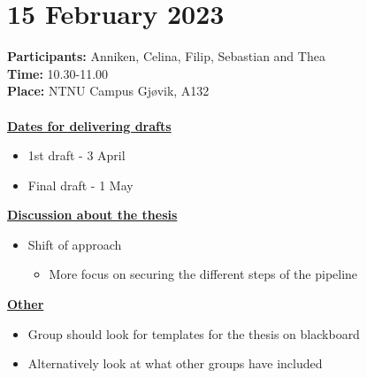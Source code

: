 \section{15 February 2023}
\textbf{Participants:} Anniken, Celina, Filip, Sebastian and Thea \\
\textbf{Time:} 10.30-11.00 \\
\textbf{Place:} NTNU Campus Gjøvik, A132
\\~\\
\textbf{\underline{Dates for delivering drafts}}
\begin{itemize}
    \item 1st draft - 3 April
    \item Final draft - 1 May
\end{itemize}

\textbf{\underline{Discussion about the thesis}}
\begin{itemize}
    \item Shift of approach
        \begin{itemize}
            \item More focus on securing the different steps of the pipeline
        \end{itemize}
\end{itemize}

\textbf{\underline{Other}}
\begin{itemize}
    \item Group should look for templates for the thesis on blackboard
    \item Alternatively look at what other groups have included
\end{itemize}

